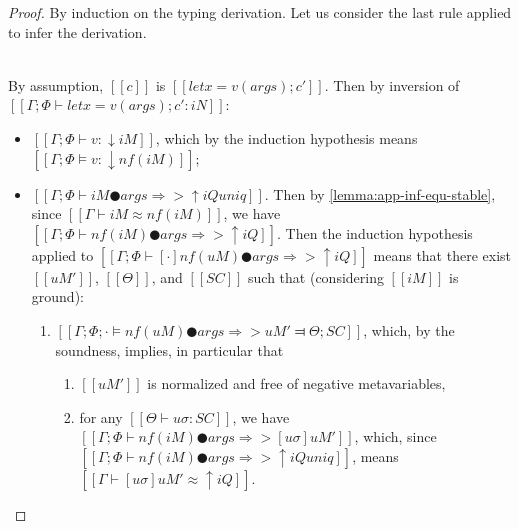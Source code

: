 \begin{proof}
    By induction on the typing derivation.
    Let us consider the last rule applied to infer the derivation.
    \begin{caseof}

        \item {}\\
            By assumption, $[[c]]$ is $[[let x = v(args); c']]$. 
            Then by inversion of
            $[[Γ ; Φ ⊢ let x = v(args); c' : iN]]$: 
            \begin{itemize}
                \item $[[Γ ; Φ ⊢ v : ↓iM]]$, 
                    which by the induction hypothesis means 
                    $[[Γ; Φ ⊨ v : ↓nf(iM)]]$;
                \item $[[Γ ; Φ ⊢ iM ● args ⇒> ↑iQ uniq]]$. 
                    Then by \cref{lemma:app-inf-equ-stable}, since 
                    $[[Γ ⊢ iM ≈ nf(iM)]]$, we have
                    $[[Γ ; Φ ⊢ nf(iM) ● args ⇒> ↑iQ]]$.
                    Then the induction hypothesis applied to 
                    $[[Γ ; Φ ⊢ [·]nf(uM) ● args ⇒> ↑iQ]]$
                    means that there exist $[[uM']]$, $[[Θ]]$, and $[[SC]]$ such that
                    (considering $[[iM]]$ is ground):
                    \begin{enumerate}
                        \item $[[ Γ; Φ; · ⊨ nf(uM) ● args ⇒> uM' ⫤ Θ; SC ]]$, 
                            which, by the soundness, implies, in particular
                            that 
                            \begin{enumerate}
                                \item $[[uM']]$ is normalized and 
                                    free of negative metavariables, 
                                \item \label{point:typing-completeness:AppLet:ih-sound} 
                                    for any $[[Θ ⊢ uσ : SC]]$, 
                                    we have $[[ Γ ; Φ ⊢ nf(iM) ● args ⇒> [uσ]uM' ]]$,
                                    which, since $[[Γ ; Φ ⊢ nf(iM) ● args ⇒> ↑iQ uniq]]$,
                                    means $[[Γ ⊢ [uσ]uM' ≈ ↑iQ]]$.

\end{enumerate}
\end{enumerate}
\end{itemize}
\end{caseof}
\end{proof}
